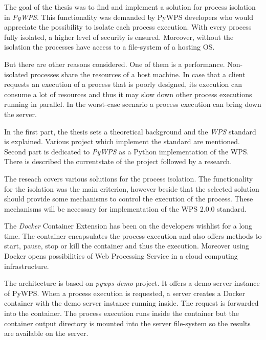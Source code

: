 \newpage
{}

The goal of the thesis was to find and implement a solution for
process isolation in \textit{PyWPS}. This functionality was demanded
by PyWPS developers who would appreciate the possibility to isolate
each process execution. With every process fully isolated, a higher
level of security is ensured. Moreover, without the isolation the
processes have access to a file-system of a hosting OS.

But there are other reasons considered. One of them is a
performance. Non-isolated processes share the resources of a host
machine. In case that a client requests an execution of a process that
is poorly designed, its execution can consume a lot of resources and
thus it may slow down other process executions running in parallel. In
the worst-case scenario a process execution can bring down the server.

In the first part, the thesis sets a theoretical background and
the \textit{WPS} standard is explained. Various project which implement the
standard are mentioned. Second part is dedicated to \textit{PyWPS} as
a Python implementation of the WPS. There is described the
currentstate of the project followed by a research.

The reseach covers various solutions for the process isolation. The
functionality for the isolation was the main criterion, however beside
that the selected solution should provide some mechanisms to control
the execution of the process. These mechanisms will be necessary for
implementation of the WPS 2.0.0 standard.

The \textit{Docker} Container Extension has been on the developers
wishlist for a long time. The container encapsulates the process
execution and also offers methods to start, pause, stop or kill the
container and thus the execution. Moreover using Docker opens
possibilities of Web Processing Service in a cloud computing
infrastructure.

The architecture is based on \textit{pywps-demo} project. It offers a
demo server instance of PyWPS. When a process execution is requested,
a server creates a Docker container with the demo server instance
running inside. The request is forwarded into the container. The
process execution runs inside the container but the container output
directory is mounted into the server file-system so the results are
available on the server.

